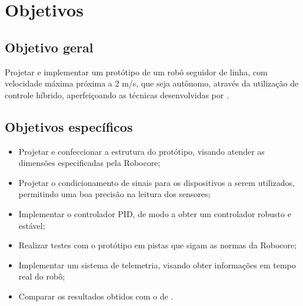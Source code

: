 \begin{spacing}{2}\end{spacing}
\section{Objetivos}\label{objetivos}


\begin{spacing}{2}\end{spacing}
\subsection{Objetivo geral}

Projetar e implementar um protótipo de um robô seguidor de linha, com velocidade máxima próxima a 2 m/s, que seja autônomo,
através da utilização de controle 
híbrido, aperfeiçoando as técnicas desenvolvidas por .

\begin{spacing}{2}\end{spacing}
\subsection{Objetivos específicos}

\begin{itemize}

 \item Projetar e confeccionar a estrutura do protótipo, visando atender as dimensões especificadas pela Robocore;

  \item Projetar o condicionamento de sinais para os dispositivos a serem utilizados, permitindo 
  uma boa precisão na leitura dos sensores;
 
 \item Implementar o controlador PID, de modo a obter um controlador robusto e estável;
 
 \item Realizar testes com o protótipo em pistas que sigam as normas da Robocore;
 
 \item Implementar um sistema de telemetria, visando obter informações em tempo real do robô;
 
 \item Comparar os resultados obtidos com o de . 
 
\end{itemize}


